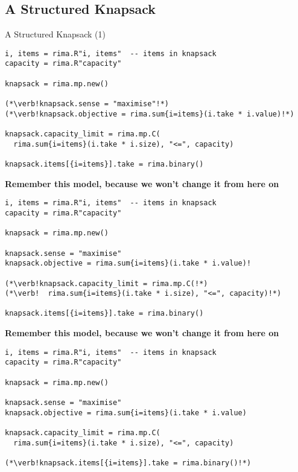 \documentclass[smaller,handout]{beamer}
\begin{document}
\subsection{A Structured Knapsack}
\begin{frame}[fragile]{A Structured Knapsack (1)}
  \vspace{-2ex}
  \begin{overprint}%
%
  \begin{lstlisting}
i, items = rima.R"i, items"  -- items in knapsack
capacity = rima.R"capacity"

knapsack = rima.mp.new()
 
(*\verb!knapsack.sense = "maximise"!*)
(*\verb!knapsack.objective = rima.sum{i=items}(i.take * i.value)!*)

knapsack.capacity_limit = rima.mp.C(
  rima.sum{i=items}(i.take * i.size), "<=", capacity)

knapsack.items[{i=items}].take = rima.binary()
  \end{lstlisting}

  \bf{Remember this model, because we won't change it from here on}

  \begin{lstlisting}
i, items = rima.R"i, items"  -- items in knapsack
capacity = rima.R"capacity"

knapsack = rima.mp.new()
 
knapsack.sense = "maximise"
knapsack.objective = rima.sum{i=items}(i.take * i.value)!

(*\verb!knapsack.capacity_limit = rima.mp.C(!*)
(*\verb!  rima.sum{i=items}(i.take * i.size), "<=", capacity)!*)

knapsack.items[{i=items}].take = rima.binary()
  \end{lstlisting}

  \bf{Remember this model, because we won't change it from here on}

  \begin{lstlisting}
i, items = rima.R"i, items"  -- items in knapsack
capacity = rima.R"capacity"

knapsack = rima.mp.new()
 
knapsack.sense = "maximise"
knapsack.objective = rima.sum{i=items}(i.take * i.value)

knapsack.capacity_limit = rima.mp.C(
  rima.sum{i=items}(i.take * i.size), "<=", capacity)

(*\verb!knapsack.items[{i=items}].take = rima.binary()!*)
  \end{lstlisting}


\end{overprint}
\end{frame}
\end{document}

